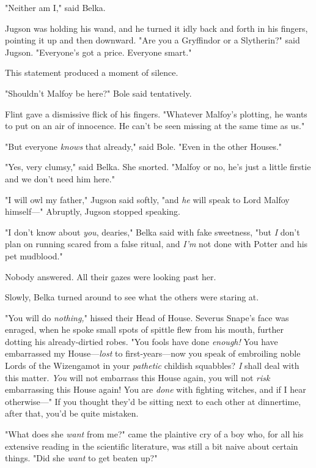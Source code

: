 "Neither am I," said Belka.

Jugson was holding his wand, and he turned it idly back and forth in his
fingers, pointing it up and then downward. "Are you a Gryffindor or a
Slytherin?" said Jugson. "Everyone's got a price. Everyone smart."

This statement produced a moment of silence.

"Shouldn't Malfoy be here?" Bole said tentatively.

Flint gave a dismissive flick of his fingers. "Whatever Malfoy's plotting, he
wants to put on an air of innocence. He can't be seen missing at the same time
as us."

"But everyone \emph{knows} that already," said Bole. "Even in the other Houses."

"Yes, very clumsy," said Belka. She snorted. "Malfoy or no, he's just a little
firstie and we don't need him here."

"I will owl my father," Jugson said softly, "and \emph{he} will speak to Lord
Malfoy himself---" Abruptly, Jugson stopped speaking.

"I don't know about \emph{you}, dearies," Belka said with fake sweetness, "but
\emph{I} don't plan on running scared from a false ritual, and \emph{I'm} not
done with Potter and his pet mudblood."

Nobody answered. All their gazes were looking past her.

Slowly, Belka turned around to see what the others were staring at.

"You will do \emph{nothing,}" hissed their Head of House. Severus Snape's face
was enraged, when he spoke small spots of spittle flew from his mouth, further
dotting his already-dirtied robes. "You fools have done \emph{enough!} You have
embarrassed my House---\emph{lost} to first-years---now you speak of embroiling
noble Lords of the Wizengamot in your \emph{pathetic} childish squabbles?
\emph{I} shall deal with this matter. \emph{You} will not embarrass this House
again, you will not \emph{risk} embarrassing this House again! You are
\emph{done} with fighting witches, and if I hear otherwise---"
\sbreak
If you thought they'd be sitting next to each other at dinnertime, after that,
you'd be quite mistaken.

"What does she \emph{want} from me?" came the plaintive cry of a boy who, for
all his extensive reading in the scientific literature, was still a bit naive
about certain things. "Did she \emph{want} to get beaten up?"

